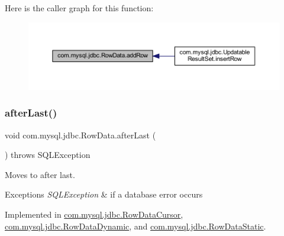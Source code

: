 Here is the caller graph for this function\+:
\nopagebreak
\begin{figure}[H]
\begin{center}
\leavevmode
\includegraphics[width=350pt]{interfacecom_1_1mysql_1_1jdbc_1_1_row_data_ac44d5df9c92d845272df5a13f15b9de7_icgraph}
\end{center}
\end{figure}
\mbox{\label{interfacecom_1_1mysql_1_1jdbc_1_1_row_data_a465a997f2fddb9de5ee12340944084fc}} 
\subsubsection{\texorpdfstring{after\+Last()}{afterLast()}}
{\footnotesize\ttfamily void com.\+mysql.\+jdbc.\+Row\+Data.\+after\+Last (\begin{DoxyParamCaption}{ }\end{DoxyParamCaption}) throws S\+Q\+L\+Exception}

Moves to after last.


\begin{DoxyExceptions}{Exceptions}
{\em S\+Q\+L\+Exception} & if a database error occurs \\
\hline
\end{DoxyExceptions}


Implemented in \mbox{\hyperlink{classcom_1_1mysql_1_1jdbc_1_1_row_data_cursor_a047166ec355bf9ee581c9e1a794bda69}{com.\+mysql.\+jdbc.\+Row\+Data\+Cursor}}, \mbox{\hyperlink{classcom_1_1mysql_1_1jdbc_1_1_row_data_dynamic_a6e2ff86fe3a346ae4f5a835470fd6986}{com.\+mysql.\+jdbc.\+Row\+Data\+Dynamic}}, and \mbox{\hyperlink{classcom_1_1mysql_1_1jdbc_1_1_row_data_static_a73788dcf4de42302d7accc1846138fbf}{com.\+mysql.\+jdbc.\+Row\+Data\+Static}}.

